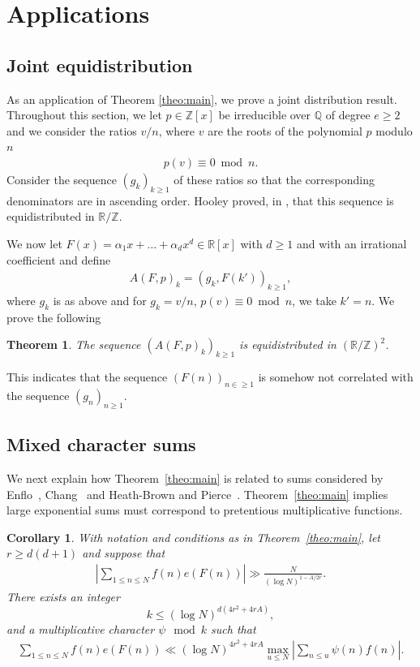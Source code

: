 \documentclass[12pt]{amsart}
\newtheorem{theorem}{Theorem}
\def\Q{{\mathbb Q}}
\def\R{{\mathbb R}}
\def\Z{{\mathbb Z}}
\newtheorem{corollary}{Corollary}
\def\le{\leqslant}
\def\ge{\geqslant}
\begin{document}
\section{Applications}
\label{sec:applications}
\subsection{Joint equidistribution}
As an application of Theorem \ref{theo:main},  we prove a joint distribution result. Throughout this section, we let $p \in \Z[x]$ be irreducible over $\Q$ of degree $e \ge 2$ and we consider the ratios $v/n$, where $v$ are the roots of the polynomial $p$ modulo $n$
\begin{align*}
p(v) \equiv 0 \bmod{n}.
\end{align*}
Consider the sequence $(g_k)_{k\ge 1}$ of these ratios so that the corresponding denominators are in ascending order.
Hooley proved, in \cite[Theorem 2]{Hooley},  that this sequence is equidistributed in $\R /\Z$.  

We now let $F(x) = \alpha_1 x + \ldots +\alpha_d x^d \in \R[x]$ with $d \ge 1$ and with an irrational coefficient and define
\begin{align*}
A(F,p)_k = ( g_k, F(k'))_{k\ge 1},
\end{align*}
where $g_k$ is as above and for  $g_k = v/n$, $p(v) \equiv 0 \bmod{n}$, we take $k'=n$. We prove the following

\begin{theorem}
\label{theorem2}
The sequence $(A(F,p)_k)_{k\ge 1}$ is equidistributed in $(\R/\Z)^2$.
\end{theorem}
This indicates that the sequence $(F(n))_{n\in \ge 1}$ is somehow not correlated with the sequence $ (g_n)_{n \ge 1}.$ %
\subsection{Mixed character sums}
We next explain how Theorem~\ref{theo:main} is related to sums considered by Enflo~\cite{Enflo}, Chang~\cite{Chang} and Heath-Brown and Pierce~\cite{H-B}.
Theorem~\ref{theo:main} implies large exponential sums must correspond to pretentious multiplicative functions.
\begin{corollary}
\label{cor:large}
With notation and conditions as in Theorem~\ref{theo:main}, let $r\ge d(d+1)$ and suppose that 
\begin{align*}
\left| \sum_{1\le n \le N}f(n)e(F(n)) \right| \gg \frac{N}{( \log{N})^{1-A/2r}}.
\end{align*}
There exists an integer 
$$k\le (\log{N})^{d(4r^2+4rA)},$$
and a multiplicative character $\psi \mod{k}$ such that 
\begin{align*}
\sum_{1\le n \le N}f(n)e(F(n))\ll (\log{N})^{4r^2+4rA}\max_{u\le N} \left| \sum_{n\le u}\psi(n)f(n)\right|.
\end{align*}
\end{corollary}
\end{document}
